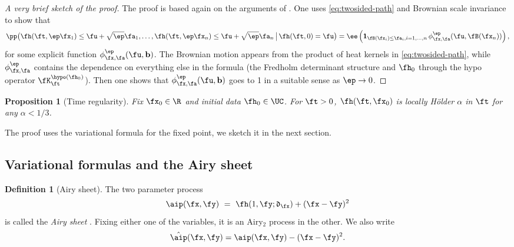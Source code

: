 \documentclass[]{pcmi}
\theoremstyle{plain}
\newtheorem{proposition}[equation]{Proposition}
\theoremstyle{definition}
\newtheorem{definition}[equation]{Definition}
\newcommand{\uno}[1]{\mathbf{1}_{#1}}
\begin{document}
\begin{proof}[A very brief sketch of the proof]
The proof is based again on the arguments of \cite{quastelRemAiry1}.
One uses \eqref{eq:twosided-path} and Brownian scale invariance to show that
\[
   \pp \bigl(\fh(\ft,\ep\fx_1)\leq \fu+\sqrt{\ep}\fa_1 , \ldots, \fh(\ft,\ep\fx_n)\leq \fu+\sqrt{\ep}\fa_n\, \big|\,\fh(\ft,0)=\fu\bigr) =\ee\left(\uno{\fB(\fx_i)\le\fa_i, i=1,\ldots,n}\,\phi^\ep_{\fx,\fa}(\fu,\fB(\fx_n))\right),
\]
for some explicit function $\phi^\ep_{\fx,\fa}(\fu,\mathbf{b})$.
The Brownian motion appears from the product of heat kernels in \eqref{eq:twosided-path}, while $\phi^\ep_{\fx,\fa}$ contains the dependence on everything else in the formula (the Fredholm determinant structure and $\fh_0$ through the hypo operator $\fK^{\hypo(\fh_0)}_\ft$).
Then one shows that $\phi^\ep_{\fx,\fa}(\fu,\mathbf{b})$ goes to 1 in a suitable sense as $\ep\to0$.
\end{proof}

\begin{proposition}[Time regularity]\label{holder}
Fix $\fx_0\in \R$ and initial data $\fh_0\in \UC$.  For $\ft>0$, $ \fh(\ft,\fx_0)$ is locally H\"older $\alpha$ in $\ft$ for any $\alpha<1/3$.  
\end{proposition} 

\noindent The proof uses the variational formula for the fixed point, we sketch it in the next section.

\subsection{Variational formulas and the Airy sheet}\label{sec:variational}

\begin{definition}[Airy sheet]  The two parameter process 
\[\aip(\fx,\fy) ~ = ~ \fh(1,\fy; \mathfrak{d}_\fx)+ (\fx-\fy)^2 \] 
is called the \emph{Airy sheet} \cite{cqrFixedPt}.  
Fixing either one of the variables, it is an Airy$_2$ process in the other.  
We also write
\[\hat\aip(\fx,\fy) = \aip(\fx,\fy)-  (\fx-\fy)^2.\]
\end{definition} 
\end{document}
